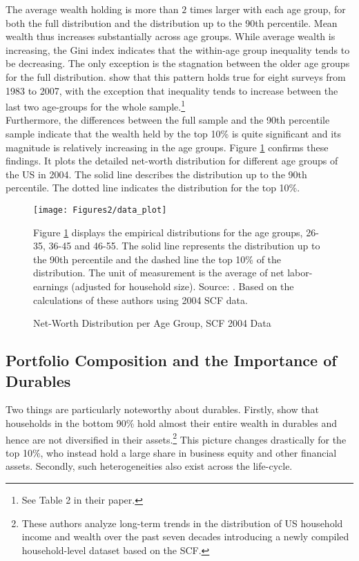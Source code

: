 \documentclass[a4paper,12pt,legno]{article}
\begin{document}
The average wealth holding is more than $2$ times larger with each age group, for both the full distribution and the distribution up to the 90th percentile. Mean wealth thus increases substantially across age groups. While average wealth is increasing, the Gini index indicates that the within-age group inequality tends to be decreasing. The only exception is the stagnation between the older age groups for the full distribution. \cite{hintermaier2011} show that this pattern holds true for eight surveys from 1983 to 2007, with the exception that inequality tends to  increase between the last two age-groups for the whole sample.\footnote{See Table 2 in their paper.} \\
Furthermore, the differences between the full sample and the 90th percentile sample indicate that the wealth held by the top 10\% is quite significant and its magnitude is relatively increasing in the age groups. Figure \ref{scf_data} confirms these findings. It plots the detailed net-worth distribution for different age groups of the US in 2004. The solid line describes the distribution up to the 90th percentile. The dotted line indicates the distribution for the top 10\%. 
\begin{figure}[!htbp]
\caption{Net-Worth Distribution per Age Group, SCF 2004 Data} 
\label{scf_data}	%
\centering
\texttt{[image: Figures2/data\_plot]}  %

\begin{minipage}{0.8\linewidth}
\footnotesize{Figure \ref{scf_data} displays the empirical distributions for the age groups, 26-35, 36-45 and 46-55. The solid line represents the distribution up to the 90th percentile and the dashed line the top 10\% of the distribution. The unit of measurement is the average of net labor-earnings (adjusted for household size). Source: \cite{hintermaier2011}. Based on the calculations of these authors using 2004 SCF data. }
\end{minipage}

\end{figure}

\subsection{Portfolio Composition and the Importance of Durables}
Two things are particularly noteworthy about durables. Firstly, \cite{kuhn2017income} show that households in the bottom 90\% hold almost their entire wealth in durables and hence are not diversified in their assets.\footnote{These authors analyze long-term trends in the distribution of US household income and wealth over the past seven decades introducing a newly compiled household-level dataset based on the SCF.} This picture changes drastically for the top 10\%, who instead hold a large share in business equity and other financial assets. Secondly, such heterogeneities also exist across the life-cycle. 
\end{document}
